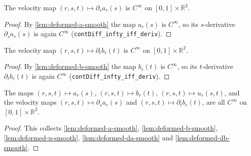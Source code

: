 \begin{lemma}
    \label{lem:deformed-da-smooth}
    The velocity map $(r,s,t)\mapsto\partial_s a_r(s)$ is $C^\infty$ on
    $[0,1]\times\mathbb{R}^2$.
\end{lemma}
\begin{proof}
    By \cref{lem:deformed-a-smooth} the map $a_r(s)$ is $C^\infty$, so its
    $s$-derivative $\partial_s a_r(s)$ is again $C^\infty$
    (\texttt{contDiff\_infty\_iff\_deriv}).
\end{proof}

\begin{lemma}
    \label{lem:deformed-db-smooth}
    The velocity map $(r,s,t)\mapsto\partial_t b_r(t)$ is $C^\infty$ on
    $[0,1]\times\mathbb{R}^2$.
\end{lemma}
\begin{proof}
    By \cref{lem:deformed-b-smooth} the map $b_r(t)$ is $C^\infty$, so its
    $t$-derivative $\partial_t b_r(t)$ is again $C^\infty$
    (\texttt{contDiff\_infty\_iff\_deriv}).
\end{proof}

\begin{lemma}
    \label{lem:deformed-diff-smooth}
    The maps $(r,s,t)\mapsto a_r(s)$, $(r,s,t)\mapsto b_r(t)$,
    $(r,s,t)\mapsto u_r(s,t)$, and the velocity maps
    $(r,s,t)\mapsto\partial_s a_r(s)$ and $(r,s,t)\mapsto\partial_t b_r(t)$, are all
    $C^\infty$ on $[0,1]\times\mathbb{R}^2$.
\end{lemma}
\begin{proof}
    This collects \cref{lem:deformed-a-smooth}, \cref{lem:deformed-b-smooth},
    \cref{lem:deformed-u-smooth}, \cref{lem:deformed-da-smooth} and
    \cref{lem:deformed-db-smooth}.
\end{proof}

